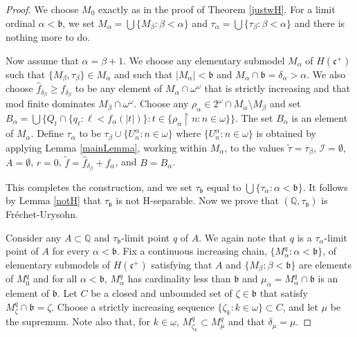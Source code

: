 \documentclass{amsart}
\theoremstyle{definition}
\theoremstyle{remark}
\begin{document}
\begin{proof}
We choose $M_0$ exactly as in the proof of
 Theorem \ref{justwH}. For a limit ordinal $\alpha < \mathfrak b$,
   we set $ M_\alpha = \bigcup\{ M_\beta : \beta < \alpha\}$ and
      $\tau_\alpha = \bigcup\{ \tau_\beta : \beta < \alpha\}$ and there
      is nothing more to do.

      Now assume that $\alpha = \beta+1$.  
We choose   any elementary submodel $M_\alpha$ of $H(\mathfrak c^+)$
such that $ \{M_\beta , \tau_\beta\}\in M_\alpha$
 and such that $|M_\alpha | < \mathfrak b$
and $M_\alpha\cap \mathfrak b =\delta_\alpha>\alpha$. 
We also choose $\hat f_{\delta_\beta}\geq f_{\delta_\beta}$
to be any element
of $M_\alpha\cap \omega^\omega$ that is strictly increasing
and that mod finite dominates
 $M_\beta\cap \omega^\omega$.
Choose any $\rho_\alpha \in  2^\omega\cap M_\alpha \setminus M_\beta$ 
and set  $B_\alpha =
\bigcup\{ Q_t \cap \{ q_\ell : \ell < f_\alpha(|t|) \}: 
  t\in \{ \rho_\alpha\restriction n : n\in \omega\}\}$.
  The set $B_\alpha$ is an element of $M_\alpha$.  
  Define
  $\tau_\alpha$ to be $\tau_\beta \cup
  \{U^\alpha_n : n\in \omega\}$ where $\{U^\alpha_n : n\in\omega\}$
  is obtained by applying Lemma \ref{mainLemma}, working within
   $M_\alpha$, to the
  values $\tilde\tau = \tau_\beta$,
  $\mathcal I = \emptyset$,
   $A=\emptyset$, $r=0$, $\tilde f = \hat f_{\delta_\beta}+f_\alpha  $, and
    $B = B_\alpha$.  
    
     
This completes the construction, and we set $\tau_{\mathfrak b}$
equal to $\bigcup\{ \tau_\alpha : \alpha < \mathfrak b\}$.  
 It follows by Lemma \ref{notH} that $\tau_{\mathfrak b}$ is not
  H-separable. Now
we prove that $(\mathbb Q, \tau_{\mathfrak b})$ is 
 Fr\'echet-Urysohn.  
 
 
 Consider any $A\subset \mathbb Q$
 and $\tau_{\mathfrak b}$-limit point $q$ of $A$.   
 We again note that $q$ is a $\tau_\alpha$-limit point 
 of $A$ for every $\alpha < \mathfrak b$. 
Fix a continuous increasing chain, $\{ M^q_\alpha : \alpha < \mathfrak b\}$,
   of elementary submodels of $H(\mathfrak c^+)$ satisfying that
   $A$ and 
     $\{ M_\beta: \beta < \mathfrak b\}$ are elements of $ M^q_0$ and for all
      $\alpha<\mathfrak b$, $M^q_\alpha$ has cardinality less
      than $\mathfrak b$ and $\mu_\alpha = M^q_\alpha\cap \mathfrak b$
      is an element of $\mathfrak b$.  Let $C$ be a closed 
      and unbounded set of $\zeta\in \mathfrak b$ that satisfy
       $M^q_\zeta \cap \mathfrak b = \zeta$. Choose a strictly
       increasing sequence $\{ \zeta_k : k\in\omega\}\subset C$,
        and let $\mu$ be the supremum. Note also that, for $k\in\omega$,
         $M^q_{\zeta_k}\subset M^q_\mu$ and that 
        $\delta_\mu = \mu$.


\end{proof}
\end{document}
